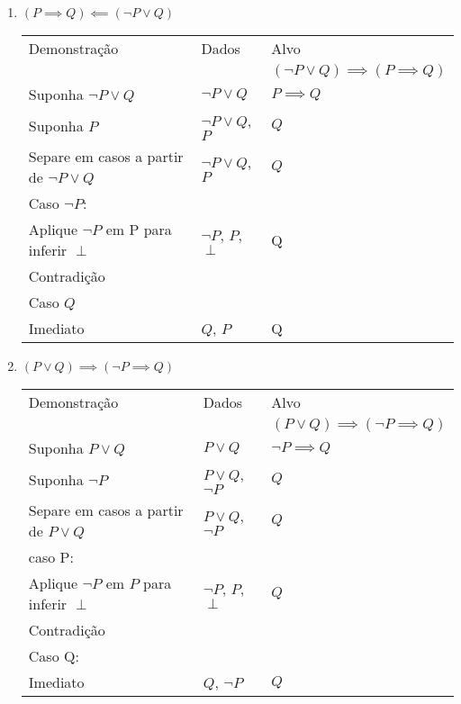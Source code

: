 \documentclass[a4paper, 12pt]{article}
\begin{document}
\begin{enumerate}
\begin{enumerate}[1.]
        \item $(P \implies Q) \impliedby (\neg P \lor Q)$
        \begin{table}[h!]
            \centering
            \begin{tabular}{|p{4cm} | p{4cm} | p{4cm} |}
            \rowcolor{gray!50}
            Demonstração & Dados & Alvo \\
            & & $(\neg P \lor Q) \implies (P \implies Q)$ \\
            Suponha $\neg P \lor Q$ & $\neg P \lor Q$ & $P \implies Q$\\
            Suponha $P$ & $\neg P \lor Q$, $P$ & $Q$\\
            Separe em casos a partir de $\neg P \lor Q$ & $\neg P \lor Q$, $P$ & $Q$\\
            \hline
            Caso $\neg P$: & & \\
            Aplique $\neg P$ em P para inferir $\perp$ & $\neg P$, $P$, $\perp$ & Q\\
            Contradição & & \\
            \hline
            Caso $Q$ & & \\
            Imediato & $Q$, $P$ & Q \\
            \hline
            \end{tabular}
        \end{table}

        \newpage
        \item $(P \lor Q) \implies (\neg P \implies Q)$
        \begin{table}[h!]
            \centering
            \begin{tabular}{|p{4cm} | p{4cm} | p{4cm} |}
            \rowcolor{gray!50}
            Demonstração & Dados & Alvo \\
            & & $(P \lor Q) \implies (\neg P \implies Q)$ \\
            Suponha $P \lor Q$ & $P \lor Q$ & $\neg P \implies Q$\\
            Suponha $\neg P$ & $P \lor Q$, $\neg P$ & $Q$ \\
            Separe em casos a partir de $P \lor Q$ & $P \lor Q$, $\neg P$ & $Q$\\
            \hline
            caso P: & & \\
            Aplique $\neg P$ em $P$ para inferir $\perp$ & $\neg P$, $P$, $\perp$ & $Q$\\
            Contradição & & \\
            \hline
            Caso Q: & & \\
            Imediato & $Q$, $\neg P$ & $Q$\\
            \hline
            \end{tabular}
        \end{table}


\end{enumerate}
\end{enumerate}
\end{document}
